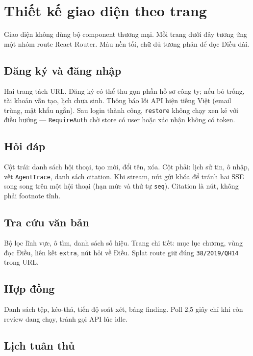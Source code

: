 \section{Thiết kế giao diện theo trang}

Giao diện không dùng bộ component thương mại. Mỗi trang dưới đây tương ứng một
nhóm route React Router. Màu nền tối, chữ đủ tương phản để đọc Điều dài.

\subsection{Đăng ký và đăng nhập}

Hai trang tách URL. Đăng ký có thể thu gọn phần hồ sơ công ty; nếu bỏ trống,
tài khoản vẫn tạo, lịch chưa sinh. Thông báo lỗi API hiện tiếng Việt (email
trùng, mật khẩu ngắn). Sau login thành công, \texttt{restore} không chạy xen
kẻ với điều hướng --- \texttt{RequireAuth} chờ store có user hoặc xác nhận
không có token.

\subsection{Hỏi đáp}

Cột trái: danh sách hội thoại, tạo mới, đổi tên, xóa. Cột phải: lịch sử tin,
ô nhập, vết \texttt{AgentTrace}, danh sách citation. Khi stream, nút gửi khóa
để tránh hai SSE song song trên một hội thoại (hạn mức và thứ tự \texttt{seq}).
Citation là nút, không phải footnote tĩnh.

\subsection{Tra cứu văn bản}

Bộ lọc lĩnh vực, ô tìm, danh sách số hiệu. Trang chi tiết: mục lục chương, vùng
đọc Điều, liên kết \texttt{extra}, nút hỏi về Điều. Splat route giữ đúng
\texttt{38/2019/QH14} trong URL.

\subsection{Hợp đồng}

Danh sách tệp, kéo-thả, tiến độ soát xét, bảng finding. Poll 2,5 giây chỉ khi
còn review đang chạy, tránh gọi API lúc idle.

\subsection{Lịch tuân thủ}

